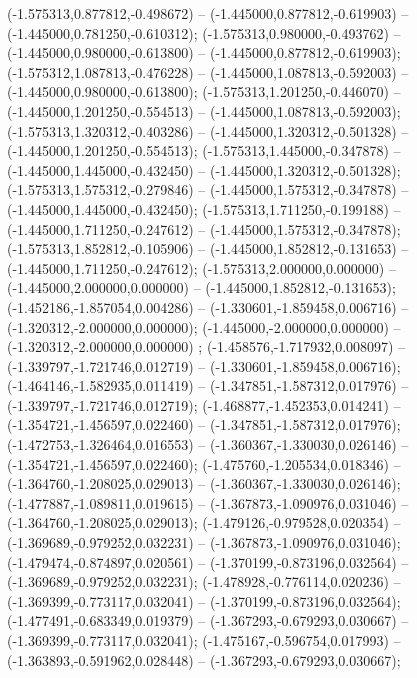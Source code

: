  (-1.575313,0.877812,-0.498672) -- (-1.445000,0.877812,-0.619903) -- (-1.445000,0.781250,-0.610312);
 (-1.575313,0.980000,-0.493762) -- (-1.445000,0.980000,-0.613800) -- (-1.445000,0.877812,-0.619903);
 (-1.575312,1.087813,-0.476228) -- (-1.445000,1.087813,-0.592003) -- (-1.445000,0.980000,-0.613800);
 (-1.575313,1.201250,-0.446070) -- (-1.445000,1.201250,-0.554513) -- (-1.445000,1.087813,-0.592003);
 (-1.575313,1.320312,-0.403286) -- (-1.445000,1.320312,-0.501328) -- (-1.445000,1.201250,-0.554513);
 (-1.575313,1.445000,-0.347878) -- (-1.445000,1.445000,-0.432450) -- (-1.445000,1.320312,-0.501328);
 (-1.575313,1.575312,-0.279846) -- (-1.445000,1.575312,-0.347878) -- (-1.445000,1.445000,-0.432450);
 (-1.575313,1.711250,-0.199188) -- (-1.445000,1.711250,-0.247612) -- (-1.445000,1.575312,-0.347878);
 (-1.575313,1.852812,-0.105906) -- (-1.445000,1.852812,-0.131653) -- (-1.445000,1.711250,-0.247612);
 (-1.575313,2.000000,0.000000) -- (-1.445000,2.000000,0.000000) -- (-1.445000,1.852812,-0.131653);
 (-1.452186,-1.857054,0.004286) -- (-1.330601,-1.859458,0.006716) -- (-1.320312,-2.000000,0.000000);
 (-1.445000,-2.000000,0.000000) -- (-1.320312,-2.000000,0.000000) ;
 (-1.458576,-1.717932,0.008097) -- (-1.339797,-1.721746,0.012719) -- (-1.330601,-1.859458,0.006716);
 (-1.464146,-1.582935,0.011419) -- (-1.347851,-1.587312,0.017976) -- (-1.339797,-1.721746,0.012719);
 (-1.468877,-1.452353,0.014241) -- (-1.354721,-1.456597,0.022460) -- (-1.347851,-1.587312,0.017976);
 (-1.472753,-1.326464,0.016553) -- (-1.360367,-1.330030,0.026146) -- (-1.354721,-1.456597,0.022460);
 (-1.475760,-1.205534,0.018346) -- (-1.364760,-1.208025,0.029013) -- (-1.360367,-1.330030,0.026146);
 (-1.477887,-1.089811,0.019615) -- (-1.367873,-1.090976,0.031046) -- (-1.364760,-1.208025,0.029013);
 (-1.479126,-0.979528,0.020354) -- (-1.369689,-0.979252,0.032231) -- (-1.367873,-1.090976,0.031046);
 (-1.479474,-0.874897,0.020561) -- (-1.370199,-0.873196,0.032564) -- (-1.369689,-0.979252,0.032231);
 (-1.478928,-0.776114,0.020236) -- (-1.369399,-0.773117,0.032041) -- (-1.370199,-0.873196,0.032564);
 (-1.477491,-0.683349,0.019379) -- (-1.367293,-0.679293,0.030667) -- (-1.369399,-0.773117,0.032041);
 (-1.475167,-0.596754,0.017993) -- (-1.363893,-0.591962,0.028448) -- (-1.367293,-0.679293,0.030667);
